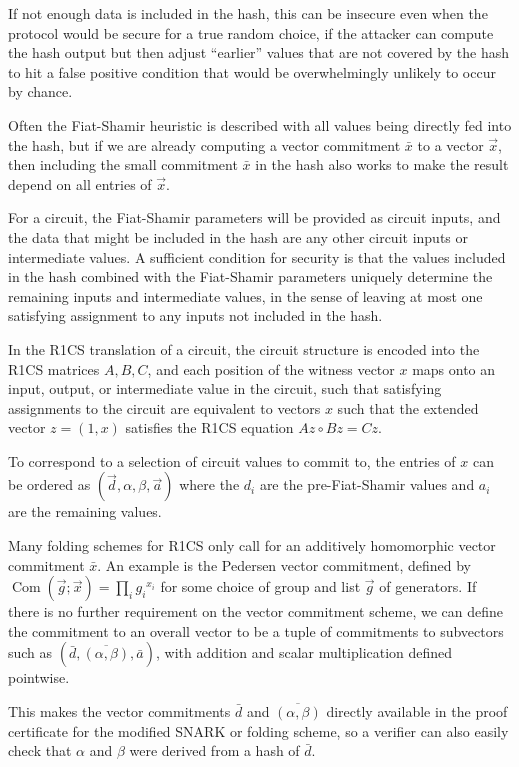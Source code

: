 \documentclass{article}
\theoremstyle{plain}
\theoremstyle{definition}
\newcommand{\Com}{\operatorname{Com}}
\begin{document}
If not enough data is included in the hash, this can be insecure
even when the protocol would be secure for a true random choice,
if the attacker can compute the hash output but then adjust ``earlier''
values that are not covered by the hash to hit a false positive
condition that would be overwhelmingly unlikely to occur by chance.

Often the Fiat-Shamir heuristic is described with all values being
directly fed into the hash, but if we are already computing a vector commitment
$\bar{x}$ to a vector $\vec{x}$, then including the small commitment
$\bar{x}$ in the hash also works to make the result depend on all entries of $\vec{x}$.

For a circuit, the Fiat-Shamir parameters will be provided as circuit
inputs, and the data that might be included in the hash
are any other circuit inputs or intermediate values.
A sufficient condition for security is that the values included in the
hash combined with the Fiat-Shamir parameters uniquely determine the
remaining inputs and intermediate values, in the sense of leaving at
most one satisfying assignment to any inputs not included in the hash.

In the R1CS translation of a circuit, the circuit structure is encoded
into the R1CS matrices $A,B,C$, and each position of the witness vector
$x$ maps onto an input, output, or intermediate value in the circuit, such
that satisfying assignments to the circuit are equivalent to vectors $x$
such that the extended vector $z = (1,x)$ satisfies the R1CS equation
$Az \circ Bz = Cz$.

To correspond to a selection of circuit values to commit to, the
entries of $x$ can be ordered as $(\vec{d},\alpha,\beta,\vec{a})$
where the $d_i$ are the pre-Fiat-Shamir values and $a_i$ are the
remaining values.

Many folding schemes for R1CS only call for an additively
homomorphic vector commitment $\bar{x}$.
An example is the Pedersen vector commitment, defined by
$\Com(\vec{g};\vec{x}) = \prod_i {g_i}^{x_i}$
for some choice of group and list $\vec{g}$ of generators.
If there is no further requirement on the vector commitment scheme,
we can define the commitment to an overall vector to be a tuple of
commitments to subvectors such as $(\bar{d},\overline{(\alpha,\beta)},\bar{a})$,
with addition and scalar multiplication defined pointwise.

This makes the vector commitments $\bar{d}$ and $\overline{(\alpha,\beta)}$
directly available in the proof certificate for the modified SNARK or folding scheme,
so a verifier can also easily check that $\alpha$ and $\beta$ were derived
from a hash of $\bar{d}$.
\end{document}
